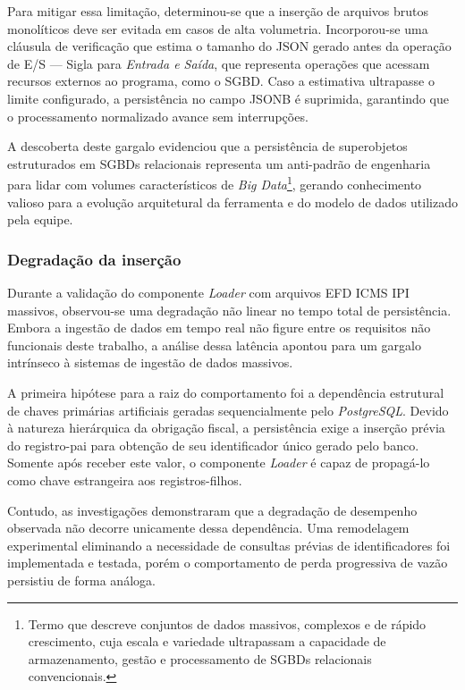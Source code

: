 Para mitigar essa limitação, determinou-se que a inserção de arquivos brutos
monolíticos deve ser evitada em casos de alta volumetria. Incorporou-se uma
cláusula de verificação que estima o tamanho do JSON gerado antes da operação
de E/S --- Sigla para \textit{Entrada e Saída}, que representa operações que
acessam recursos externos ao programa, como o SGBD. Caso a estimativa ultrapasse
o limite configurado, a persistência no campo JSONB é suprimida,
garantindo que o processamento normalizado avance sem interrupções. 

A descoberta deste gargalo evidenciou que a persistência de superobjetos
estruturados em SGBDs relacionais representa um anti-padrão de engenharia
para lidar com volumes característicos de \textit{Big Data}\footnote{Termo que
descreve conjuntos de dados massivos, complexos e de rápido crescimento, cuja
escala e variedade ultrapassam a capacidade de armazenamento, gestão e
processamento de SGBDs relacionais convencionais.}, gerando
conhecimento valioso para a evolução arquitetural da ferramenta e
do modelo de dados utilizado pela equipe.

\subsubsection{Degradação da inserção}
\label{sec:degradacao_insercao}
Durante a validação do componente \textit{Loader} com arquivos EFD ICMS IPI
massivos, observou-se uma degradação não linear no tempo total de persistência.
Embora a ingestão de dados em tempo real não figure entre
os requisitos não funcionais deste trabalho, a análise dessa latência apontou
para um gargalo intrínseco à sistemas de ingestão de dados massivos.

A primeira hipótese para a raiz do comportamento foi a dependência estrutural
de chaves primárias artificiais geradas sequencialmente pelo
\textit{PostgreSQL}. Devido à natureza hierárquica da obrigação fiscal, a
persistência exige a inserção prévia do registro-pai para obtenção de seu
identificador único gerado pelo banco. Somente após receber este valor, o
componente \textit{Loader} é capaz de propagá-lo como chave estrangeira
aos registros-filhos.

Contudo, as investigações demonstraram que a degradação de desempenho observada
não decorre unicamente dessa dependência. Uma remodelagem experimental
eliminando a necessidade de consultas prévias de identificadores foi
implementada e testada, porém o comportamento de perda progressiva de vazão
persistiu de forma análoga.

